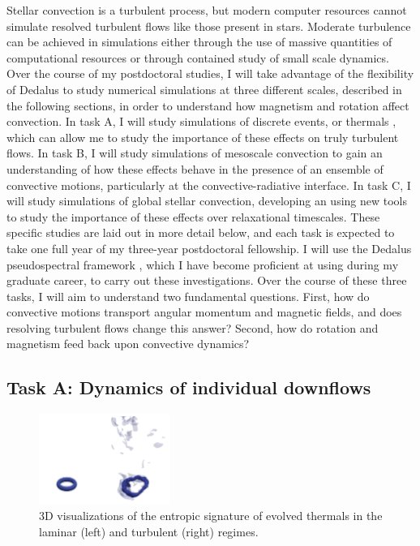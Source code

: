 \documentclass[aasms,12pt]{article}
\begin{document}
Stellar convection is a turbulent process, but modern computer resources cannot simulate resolved turbulent flows like those present in stars.
Moderate turbulence can be achieved in simulations either through the use of massive quantities of computational resources or through contained study of small scale dynamics.
Over the course of my postdoctoral studies, I will take advantage of the flexibility of Dedalus to study numerical simulations at three different scales, described in the following sections, in order to understand how magnetism and rotation affect convection.
In task A, I will study simulations of discrete events, or thermals \citep[as in ][]{andersLB2019}, which can allow me to study the importance of these effects on truly turbulent flows.
In task B, I will study simulations of mesoscale convection \citep[as in ][]{anders&brown2017} to gain an understanding of how these effects behave in the presence of an ensemble of convective motions, particularly at the convective-radiative interface.
In task C, I will study simulations of global stellar convection, developing an using new tools to study the importance of these effects over relaxational timescales.
These specific studies are laid out in more detail below, and each task is expected to take one full year of my three-year postdoctoral fellowship.
I will use the Dedalus pseudospectral framework \citep{burns&all2019}, which I have become proficient at using during my graduate career, to carry out these investigations.
Over the course of these three tasks, I will aim to understand two fundamental questions.
First, how do convective motions transport angular momentum and magnetic fields, and does resolving turbulent flows change this answer?
Second, how do rotation and magnetism feed back upon convective dynamics?

\subsection{Task A: Dynamics of individual downflows}
\begin{figure}
	\begin{center}
	\vspace{-10pt}
    \includegraphics[width=0.38\textwidth]{./figs/thermals_comparison.png}
	\vspace{-15pt}
	\end{center}
    \caption{
	3D visualizations of the entropic signature of evolved thermals in the laminar (left) and turbulent (right) regimes.
	\label{fig:thermals_comparison} }
\end{figure}
\end{document}
